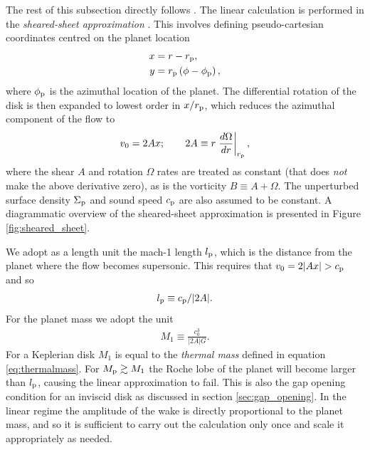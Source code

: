 The rest of this subsection directly follows \citet{goodman2001}. 
The linear calculation is performed in the \textit{sheared-sheet approximation} \citep{hill1878,goldreich1965}.
This involves defining pseudo-cartesian coordinates centred on the planet location
\begin{align}
    x &= r - r_{\rm p}, \\
    y &= r_{\rm p} \left( \phi - \phi_{\rm p} \right),
\end{align}
where $\phi_{\rm p}$ is the azimuthal location of the planet.
The differential rotation of the disk is then expanded to lowest order in $x/r_{\rm p}$, which reduces the azimuthal component of the flow to
\begin{align}
    v_0 = 2 A x; \qquad 2A \equiv r \left. \frac{d \Omega}{dr} \right|_{r_{\rm p}},
\end{align}
where the shear $A$ and rotation $\Omega$ rates are treated as constant (that does \textit{not} make the above derivative zero), as is the vorticity $B \equiv A+\Omega$.
The unperturbed surface density $\Sigma_{\rm p}$ and sound speed $c_{\rm p}$ are also assumed to be constant.
A diagrammatic overview of the sheared-sheet approximation is presented in Figure \ref{fig:sheared_sheet}.

We adopt as a length unit the mach-1 length $l_{\rm p}$, which is the distance from the planet where the flow becomes supersonic.
This requires that $v_0 = 2|Ax| > c_{\rm p}$ and so 
\begin{align}
    l_{\rm p} \equiv c_{\rm p} / |2A|. \label{eq:mach1_len}
\end{align}
For the planet mass we adopt the unit
\begin{align}
    M_1 \equiv \frac{c_0^3}{|2A|G}. \label{eq:char_mass}
\end{align}
For a Keplerian disk $M_1$ is equal to the \textit{thermal mass} defined in equation \ref{eq:thermalmass}.
For $M_{\rm p} \gtrsim M_1$ the Roche lobe of the planet will become larger than $l_{\rm p}$, causing the linear approximation to fail.
This is also the gap opening condition for an inviscid disk as discussed in section \ref{sec:gap_opening}.
In the linear regime the amplitude of the wake is directly proportional to the planet mass, and so it is sufficient to carry out the calculation only once and scale it appropriately as needed.

